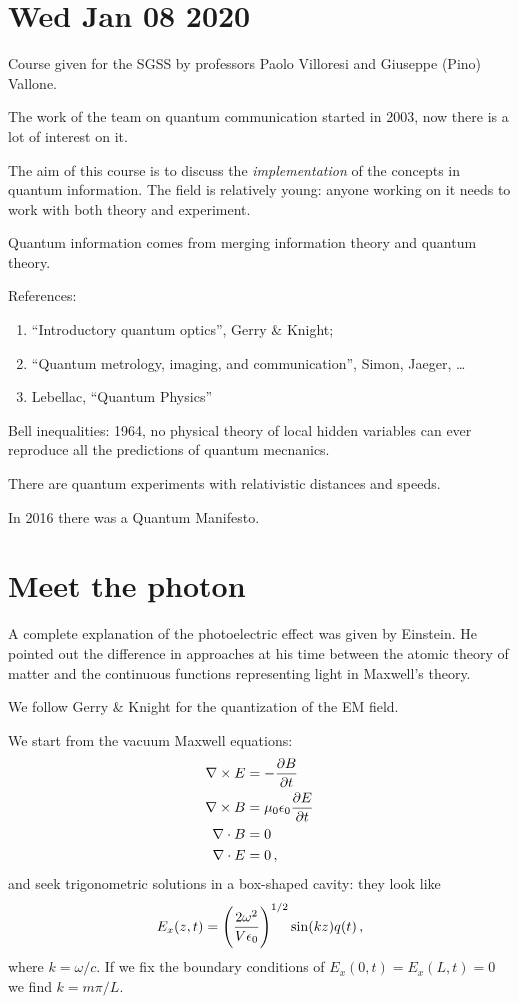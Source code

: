 \documentclass[main.tex]{subfiles}
\begin{document}
\section*{Wed Jan 08 2020}

Course given for the SGSS by professors Paolo Villoresi and Giuseppe (Pino) Vallone. 

The work of the team on quantum communication started in 2003, now there is a lot of interest on it.

The aim of this course is to discuss the \emph{implementation} of the concepts in quantum information. 
The field is relatively young: anyone working on it needs to work with both theory and experiment. 

Quantum information comes from merging information theory and quantum theory. 

References: 
\begin{enumerate}
  \item ``Introductory quantum optics'', Gerry \& Knight;
  \item ``Quantum metrology, imaging, and communication'', Simon, Jaeger, \dots
  \item Lebellac, ``Quantum Physics''
\end{enumerate}

Bell inequalities: 1964, no physical theory of local hidden variables can ever reproduce all the predictions of quantum mecnanics.

There are quantum experiments with relativistic distances and speeds.

In 2016 there was a Quantum Manifesto. 

\section{Meet the photon}

A complete explanation of the photoelectric effect was given by Einstein.
He pointed out the difference in approaches at his time between the atomic theory of matter and the continuous functions representing light in Maxwell's theory. 

We follow Gerry \& Knight for the quantization of the EM field. 

We start from the vacuum Maxwell equations: 
%
\begin{align}
\nabla \times E &= - \pdv{B}{t}  \\
\nabla \times B &= \mu_0 \epsilon_0 \pdv{E}{t}  \\
\nabla \cdot B &= 0  \\
\nabla \cdot E &= 0  
\,,
\end{align}
%
and seek trigonometric solutions in a box-shaped cavity: they look like 
%
\begin{align}
E_x (z, t) = \qty(\frac{2 \omega^2}{V \epsilon_0 })^{1/2} \sin(kz) q(t)
\,,
\end{align}
%
where \(k = \omega /c\). If we fix the boundary conditions of \(E_x (0, t) = E_x (L,t) = 0\) we find \(k = m \pi /L\). 
\end{document}
